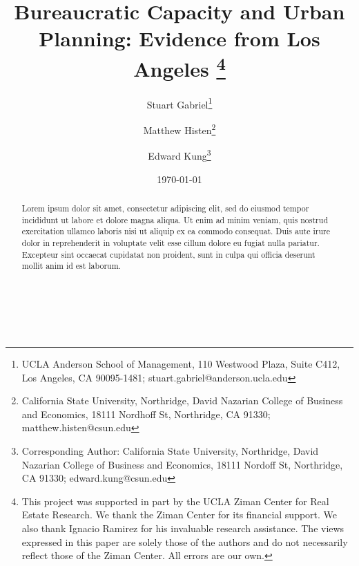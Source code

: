 \documentclass[12pt,english,hyperfootnotes=false,hidelinks]{article}
\title{
Bureaucratic Capacity and Urban Planning: Evidence from Los Angeles
\thanks{
This project was supported in part by the UCLA Ziman Center for Real Estate Research. We thank the Ziman Center for its financial support. We also thank Ignacio Ramirez for his invaluable research assistance. The views expressed in this paper are solely those of the authors and do not necessarily reflect those of the Ziman Center. All errors are our own.
}
}
\author{
    Stuart Gabriel\thanks{UCLA Anderson School of Management, 110 Westwood Plaza, Suite C412, Los Angeles, CA 90095-1481;  stuart.gabriel@anderson.ucla.edu} \and
    Matthew Histen\thanks{California State University, Northridge, David Nazarian College of Business and Economics, 18111 Nordhoff St, Northridge, CA 91330; matthew.histen@csun.edu} \and
    Edward Kung\thanks{Corresponding Author: California State University, Northridge, David Nazarian College of Business and Economics, 18111 Nordoff St, Northridge, CA 91330; edward.kung@csun.edu}
}
\date{\today}
\begin{document}
\maketitle

\singlespacing

\vspace{-1cm}

\begin{abstract}
Lorem ipsum dolor sit amet, consectetur adipiscing elit, sed do eiusmod tempor incididunt ut labore et dolore magna aliqua. Ut enim ad minim veniam, quis nostrud exercitation ullamco laboris nisi ut aliquip ex ea commodo consequat. Duis aute irure dolor in reprehenderit in voluptate velit esse cillum dolore eu fugiat nulla pariatur. Excepteur sint occaecat cupidatat non proident, sunt in culpa qui officia deserunt mollit anim id est laborum.
\end{abstract}


 \\
 \\


\doublespacing

\pagebreak












\pagebreak
\end{document}
